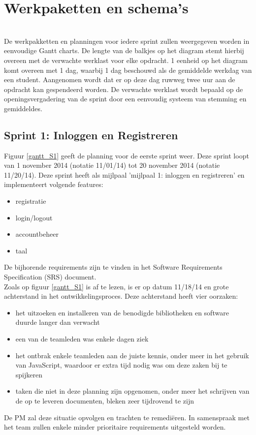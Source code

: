 \documentclass{article}
\begin{document}
 \clearpage
\section{Werkpaketten en schema's }

 \newline
\\
\noindent De werkpakketten en planningen voor iedere sprint zullen weergegeven worden in eenvoudige Gantt charts. De lengte van de balkjes op het diagram stemt hierbij overeen met de verwachte werklast voor elke opdracht. 1 eenheid op het diagram komt overeen met 1 dag, waarbij 1 dag beschouwd als de gemiddelde werkdag van een student. Aangenomen wordt dat er op deze dag ruwweg twee uur aan de opdracht kan gespendeerd worden. De verwachte werklast wordt bepaald op de openingsvergadering van de sprint door een eenvoudig systeem van stemming en gemiddeldes. \newline

%
\subsection{Sprint 1:  Inloggen en Registreren}

Figuur \ref{gantt_S1} geeft de planning voor de eerste sprint weer. Deze sprint loopt van 1 november 2014 (notatie 11/01/14)  tot 20 november 2014 (notatie 11/20/14). Deze sprint heeft als mijlpaal 'mijlpaal 1: inloggen en registreren' en implementeert volgende features:
\begin{itemize}
\item registratie
\item login/logout
\item accountbeheer
\item taal
\end{itemize}

\noindent De bijhorende requirements zijn te vinden in het Software Requirements Specification (SRS) document. \newline
\\
\noindent Zoals op figuur \ref{gantt_S1}  is af te lezen, is er op datum 11/18/14 en grote achterstand in het ontwikkelingsproces. Deze achterstand heeft vier oorzaken: 
\begin{itemize}
\item het uitzoeken en installeren van de benodigde bibliotheken en software duurde langer dan verwacht
\item een van de teamleden was enkele dagen ziek
\item het ontbrak enkele teamleden aan de juiste kennis, onder meer in het gebruik van JavaScript, waardoor er extra tijd nodig was om deze zaken bij te spijkeren 
\item taken die niet in deze planning zijn opgenomen, onder meer het schrijven van de op te leveren documenten, bleken zeer tijdrovend te zijn
\end{itemize}
De PM zal deze situatie opvolgen en trachten te remedi\"{e}ren. In samenspraak met het team zullen enkele minder prioritaire requirements uitgesteld worden. 
\end{document}
